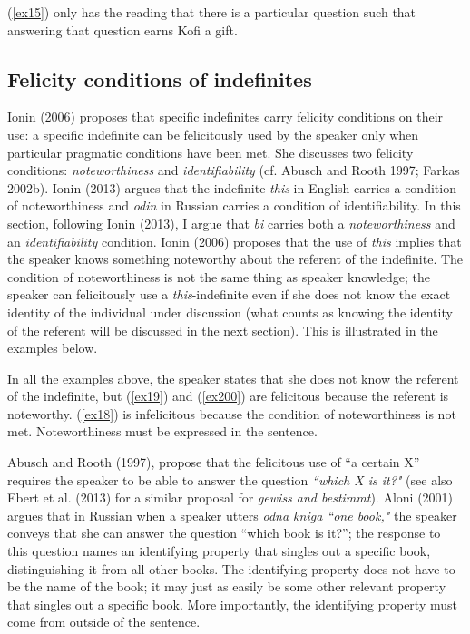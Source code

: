 \documentclass[output=paper,modfonts]{langsci/langscibook}
\begin{document}
(\ref{ex15}) only has the reading that there is a particular question such that answering that question earns Kofi a gift. 

\subsection{Felicity conditions of indefinites}

Ionin (2006) proposes that specific indefinites carry felicity conditions on their use: a specific indefinite can be felicitously used by the speaker only when particular pragmatic conditions have been met. She discusses two felicity conditions: \emph{noteworthiness} and \emph{identifiability} (cf. Abusch and Rooth 1997; Farkas 2002b). Ionin (2013) argues that the indefinite \emph{this} in English carries a condition of noteworthiness and \emph{odin} in Russian carries a condition of identifiability. In this section, following Ionin (2013), I  argue that \emph{bi} carries both a \emph{noteworthiness} and an \emph{identifiability} condition. Ionin (2006) proposes that the use of \emph{this} implies that the speaker knows something noteworthy about the referent of the indefinite. The condition of noteworthiness is not the same thing as speaker knowledge; the speaker can felicitously use a \emph{this}-indefinite even if she does not know the exact identity of the individual under discussion (what counts as knowing the identity of the referent will be discussed in the next section). This is illustrated in the examples below. 
\ea {}\\

 \label{ex18}

\label{ex19}
 \label{ex200}

\z
\z

In all the examples above, the speaker states that she does not know the referent of the indefinite, but (\ref{ex19}) and (\ref{ex200}) are felicitous because the referent is noteworthy. (\ref{ex18}) is infelicitous because the condition of noteworthiness is not met. Noteworthiness must be expressed in the sentence.

Abusch and Rooth (1997), propose that the felicitous use of  ``a certain X” requires the speaker to be able to answer the question \emph{``which X is it?"} (see also Ebert et al. (2013) for a similar proposal for \emph{gewiss and bestimmt}). Aloni (2001) argues that in Russian when a  speaker utters \emph{odna kniga ``one book,"} the speaker conveys that she can answer the question ``which book is it?”; the response to this question names an identifying property that singles out a specific book, distinguishing it from all other books. The identifying property does not have to be the name of the book; it may just as easily be some other relevant property that singles out a specific book. More importantly, the identifying property must come from outside of the sentence.
\end{document}

